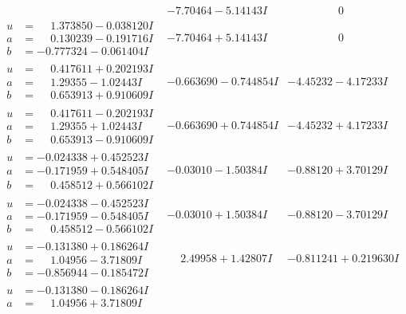 \documentclass[1p]{elsarticle_modified}
\theoremstyle{definition}
\begin{document}
$$\begin{array}{c|c|c}
 & -7.70464 - 5.14143 I & \phantom{-0.000000 } 0 \\ \hline\begin{aligned}
u &= \phantom{-}1.373850 - 0.038120 I \\
a &= \phantom{-}0.130239 - 0.191716 I \\
b &= -0.777324 - 0.061404 I\end{aligned}
 & -7.70464 + 5.14143 I & \phantom{-0.000000 } 0 \\ \hline\begin{aligned}
u &= \phantom{-}0.417611 + 0.202193 I \\
a &= \phantom{-}1.29355 - 1.02443 I \\
b &= \phantom{-}0.653913 + 0.910609 I\end{aligned}
 & -0.663690 - 0.744854 I & -4.45232 - 4.17233 I \\ \hline\begin{aligned}
u &= \phantom{-}0.417611 - 0.202193 I \\
a &= \phantom{-}1.29355 + 1.02443 I \\
b &= \phantom{-}0.653913 - 0.910609 I\end{aligned}
 & -0.663690 + 0.744854 I & -4.45232 + 4.17233 I \\ \hline\begin{aligned}
u &= -0.024338 + 0.452523 I \\
a &= -0.171959 + 0.548405 I \\
b &= \phantom{-}0.458512 + 0.566102 I\end{aligned}
 & -0.03010 - 1.50384 I & -0.88120 + 3.70129 I \\ \hline\begin{aligned}
u &= -0.024338 - 0.452523 I \\
a &= -0.171959 - 0.548405 I \\
b &= \phantom{-}0.458512 - 0.566102 I\end{aligned}
 & -0.03010 + 1.50384 I & -0.88120 - 3.70129 I \\ \hline\begin{aligned}
u &= -0.131380 + 0.186264 I \\
a &= \phantom{-}1.04956 - 3.71809 I \\
b &= -0.856944 - 0.185472 I\end{aligned}
 & \phantom{-}2.49958 + 1.42807 I & -0.811241 + 0.219630 I \\ \hline\begin{aligned}
u &= -0.131380 - 0.186264 I \\
a &= \phantom{-}1.04956 + 3.71809 I \\

\end{aligned}
\end{array}$$
\end{document}
